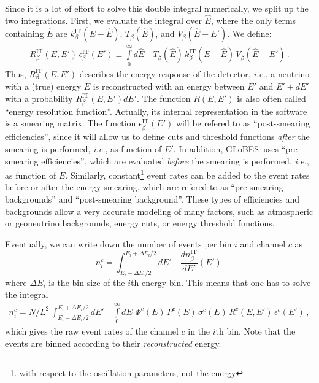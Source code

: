 \documentclass[12pt,a4paper]{article}
\newcommand{\ie}{{\it i.e.}}
\newcommand{\GLOBES}{{\sf GLoBES}}
\begin{document}
Since it is a lot of effort to solve this double integral numerically,
we split up the two integrations. First, we evaluate the integral over
$\hat{E}$, where the only terms containing $\hat{E}$ are
$k_\beta^{\text{IT}}(E-\hat{E})$,  $ T_\beta(\hat{E})$, and 
$ V_\beta(\hat{E}-E')$. We define:
\begin{eqnarray}
\label{equ:e_res} 
R_\beta^{\text{IT}}(E,E')\,\epsilon_\beta^{\text{IT}}(E')
 \equiv
\int\limits_0^\infty d\hat{E} \quad T_\beta(\hat{E})\,k_\beta^{\text{IT}}(E-\hat{E})
\,V_\beta(\hat{E}-E')\,. 
\end{eqnarray}
Thus, $R_\beta^{\text{IT}}(E,E')$ describes the energy response of 
the detector, \ie , a neutrino with a (true) energy $E$ is reconstructed
with an energy between $E'$ and $E'+dE'$ with a probability
$R_\beta^{\text{IT}}(E,E') dE'$. The function $R(E,E')$ is also often called ``energy resolution function''. Actually, its internal representation
in the software is a smearing matrix. The function $\epsilon_\beta^{\text{IT}}(E')$ will be refered to as ``post-smearing efficiencies'', since it will allow us to define cuts and threshold functions {\em after} the smearing is performed, \ie, as function of $E'$. 
In addition, \GLOBES\ uses ``pre-smearing efficiencies'', which are 
evaluated {\em before} the smearing is performed, \ie, as function of $E$.
Similarly, constant\footnote{with respect to the oscillation parameters, 
not the energy} event rates can be added to the event rates before or 
after the energy smearing, which are refered to as 
``pre-smearing backgrounds'' and ``post-smearing background''. These types of 
efficiencies and backgrounds allow a very accurate modeling of
many factors, such as atmospheric or geoneutrino backgrounds, energy cuts, or
energy threshold functions.

Eventually, we can write down the number of events per bin $i$  and channel $c$ as
\begin{equation}
\label{equ:channel}
n_i^c=\int_{E_i-\Delta E_i/2}^{E_i+\Delta E_i/2} dE' \quad
\frac{dn_{\beta}^{\text{IT}}}{dE'} (E') \,
\end{equation}
where $\Delta E_i$ is the bin size of the $i$th energy bin.
This means that one has to solve the integral
\begin{eqnarray}
\label{equ:events_bin}
n_i^c=N/L^2\,\int_{E_i-\Delta E_i/2}^{E_i+\Delta E_i/2} dE' 
\quad \int\limits_0^\infty dE \,\, \Phi^c(E)\,
P^c(E)\,
\sigma^c(E)\,
R^c(E,E')\,
\epsilon^c(E')\,,
\end{eqnarray} 
which gives the raw event rates of the channel $c$ in the $i$th bin.
Note that the events are binned according to their \emph{reconstructed} energy.
\end{document}
